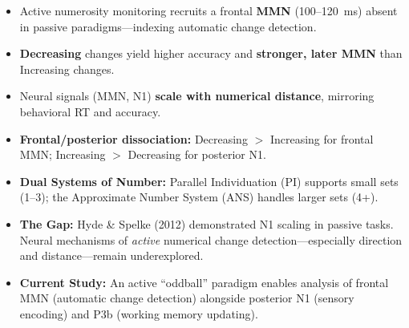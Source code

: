 \begin{tcolorbox}[posterbox]
\SmallText
\begin{itemize}
  \item Active numerosity monitoring recruits a frontal \textbf{MMN} (100--120~ms) absent in passive paradigms---indexing automatic change detection.
  \item \textbf{Decreasing} changes yield higher accuracy and \textbf{stronger, later MMN} than Increasing changes.
  \item Neural signals (MMN, N1) \textbf{scale with numerical distance}, mirroring behavioral RT and accuracy.
  \item \textbf{Frontal/posterior dissociation:} Decreasing $>$ Increasing for frontal MMN; Increasing $>$ Decreasing for posterior N1.
\end{itemize}
\end{tcolorbox}

\vspace{0.06in}

\begin{tcolorbox}[posterbox]
\SmallText
\begin{itemize}
  \item \textbf{Dual Systems of Number:} Parallel Individuation (PI) supports small sets (1--3); the Approximate Number System (ANS) handles larger sets (4+).
  \item \textbf{The Gap:} Hyde \& Spelke (2012) demonstrated N1 scaling in passive tasks. Neural mechanisms of \textit{active} numerical change detection---especially direction and distance---remain underexplored.
  \item \textbf{Current Study:} An active ``oddball'' paradigm enables analysis of frontal MMN (automatic change detection) alongside posterior N1 (sensory encoding) and P3b (working memory updating).
\end{itemize}
\end{tcolorbox}

\vspace{0.06in}

